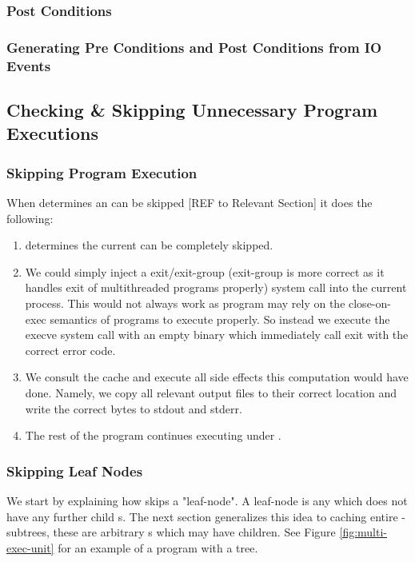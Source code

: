 \subsubsection{Post Conditions}
\subsubsection{Generating Pre Conditions and Post Conditions from IO Events}

\subsection{Checking \& Skipping Unnecessary Program Executions}
\subsubsection{Skipping Program Execution}
\label{sec:skipping-program-execution}
When \pc determines an \cacheunit{} can be skipped [REF to Relevant Section] it does the following:
\begin{enumerate}
  \item \pc determines the current \cacheunit{} can be completely skipped.
  \item We could simply inject a exit/exit-group (exit-group is more correct as it handles exit of multithreaded programs properly) system call into the current process. This would not always work as program may rely on
  the close-on-exec semantics of programs to execute properly. So instead we execute the execve system call with an empty binary which immediately call exit with the correct error code.
  \item We consult the cache and execute all side effects this computation would have done. Namely, we copy all relevant output files to their correct location and write the correct bytes to stdout and stderr.
  \item The rest of the program continues executing under \pc.
\end{enumerate}

\subsubsection{Skipping Leaf Nodes}
We start by explaining how \pc skips a "leaf-node". A leaf-node is any \cacheunit{} which does not have any further child \cacheunit{}s. The next section generalizes this idea to caching entire \cacheunit{}-subtrees, these are arbitrary \cacheunit{}s which may have children. See Figure \ref{fig:multi-exec-unit} for an example of a program with a \cacheunit{} tree.

